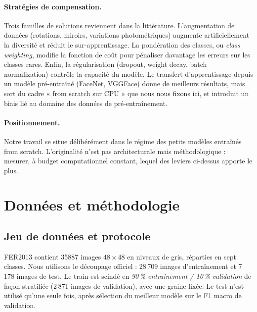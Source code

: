 \documentclass[11pt,a4paper]{article}
\newcommand{\TrainSize}{28\,709}
\newcommand{\TestSize}{7\,178}
\newcommand{\ValSize}{2\,871}
\begin{document}
\paragraph{Stratégies de compensation.}
Trois familles de solutions reviennent dans la littérature. L'augmentation de
données (rotations, miroirs, variations photométriques) augmente
artificiellement la diversité et réduit le sur-apprentissage. La pondération
des classes, ou \emph{class weighting}, modifie la fonction de coût pour
pénaliser davantage les erreurs sur les classes rares. Enfin, la
régularisation (dropout, weight decay, batch normalization) contrôle la
capacité du modèle. Le transfert d'apprentissage depuis un modèle pré-entraîné
(FaceNet, VGGFace) donne de meilleurs résultats, mais sort du cadre
« from scratch sur CPU » que nous nous fixons ici, et introduit un biais lié
au domaine des données de pré-entraînement.

\paragraph{Positionnement.}
Notre travail se situe délibérément dans le régime des petits modèles
entraînés from scratch. L'originalité n'est pas architecturale mais
méthodologique : mesurer, à budget computationnel constant, lequel des leviers
ci-dessus apporte le plus.

\section{Données et méthodologie}

\subsection{Jeu de données et protocole}

FER2013 contient \num{35887} images $48\times48$ en niveaux de gris, réparties
en sept classes. Nous utilisons le découpage officiel : \TrainSize{} images
d'entraînement et \TestSize{} images de test. Le train est scindé en
\emph{90\,\% entraînement / 10\,\% validation} de façon stratifiée
(\ValSize{} images de validation), avec une graine fixée. Le test n'est
utilisé qu'une seule fois, après sélection du meilleur modèle sur le F1 macro
de validation.
\end{document}
